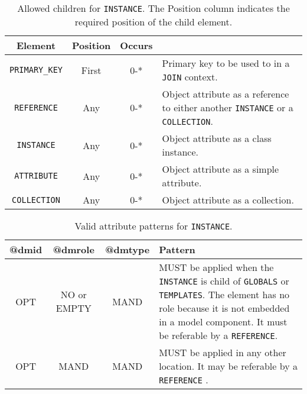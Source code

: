  
\begin{table}[!htbp]
\small
\centering
\begin{tabulary}{\linewidth}{|c |c |c|J|}
    \hline 
        \textbf{Element} &
        \textbf{Position} &
        \textbf{Occurs} &
        \\
    \hline      \hline  
        \texttt{PRIMARY\_KEY}  &        
        First &           
        0-* &
        Primary key to be used to in a \texttt{JOIN} context.\\
    \hline    
        \texttt{REFERENCE}  &        
        Any &           
        0-* &
         Object attribute as a reference to either another \texttt{INSTANCE} or a \texttt{COLLECTION}. \\
    \hline    
        \texttt{INSTANCE} &           
        Any &           
        0-* &
         Object attribute as a class instance. \\
    \hline    
        \texttt{ATTRIBUTE} &           
        Any &           
        0-* &
       Object attribute as a simple attribute. \\
    \hline    
        \texttt{COLLECTION} &           
        Any &           
        0-* &
         Object attribute  as a collection.\\
    \hline 
\end{tabulary}
     \caption{Allowed children for \texttt{INSTANCE}. The Position column indicates the required position of the child element.} 
     \label{tbl:instance-chilren}
\end{table}
 
\begin{table}[!htbp]
\small
\centering
\begin{tabulary}{\linewidth}{|c|c|c|J|}
    \hline 
        \textbf{@dmid} &
        \textbf{@dmrole} &
        \textbf{@dmtype} &
        \textbf{Pattern}\\
    \hline      \hline  
        OPT &           
        NO or EMPTY&           
        MAND &           
        MUST be applied when the  \texttt{INSTANCE} is child of \texttt{GLOBALS} or \texttt{TEMPLATES}. The element has no role because it is not embedded in a model component. It must be referable by a \texttt{REFERENCE}.  \\
    \hline   
        OPT &           
        MAND &           
        MAND &           
        MUST be applied in any other location. It may be referable by a \texttt{REFERENCE} . \\
   \hline 
\end{tabulary}
     \caption{Valid attribute patterns for  \texttt{INSTANCE}.} 
     \label{tbl:instance-pattern}
 \end{table}       
\newpage

 
